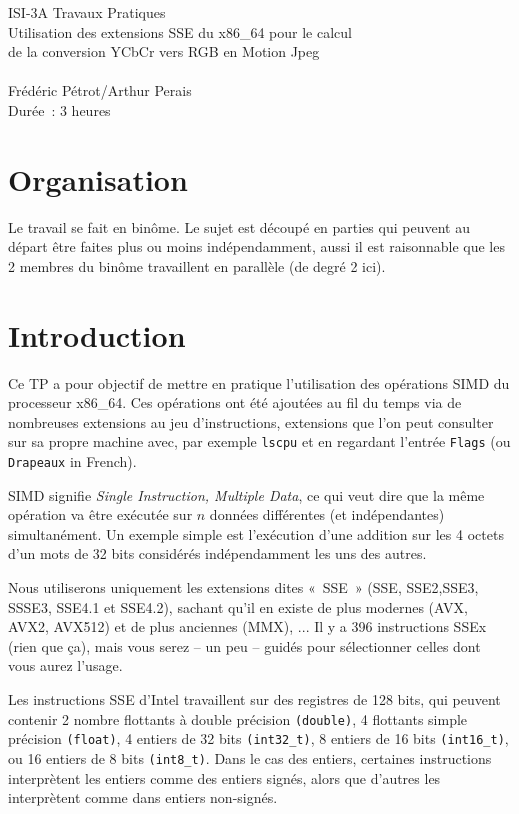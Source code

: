 \documentclass[a4paper,12pt]{article}
\begin{document}
\begin{center}
\Large
ISI-3A Travaux Pratiques\\
Utilisation des extensions SSE du x86\_64 pour le calcul\\
de la conversion YCbCr vers RGB en Motion Jpeg\\~\\
\large
Frédéric Pétrot/Arthur Perais\\
Durée~: 3 heures
\end{center}

\section{Organisation}
Le travail se fait en binôme.
Le sujet est découpé en parties qui peuvent au départ être faites plus ou moins indépendamment, aussi il est raisonnable que les 2 membres du binôme travaillent en parallèle (de degré 2 ici).

\section{Introduction}
Ce TP a pour objectif de mettre en pratique l'utilisation des opérations SIMD du processeur x86\_64.
Ces opérations ont été ajoutées au fil du temps via de nombreuses extensions au jeu d'instructions, extensions que l'on peut consulter sur sa propre machine avec, par exemple \texttt{lscpu} et en regardant l'entrée \texttt{Flags} (ou \texttt{Drapeaux} in French).

SIMD signifie \emph{Single Instruction, Multiple Data}, ce qui veut dire que la même opération va être exécutée sur $n$ données différentes (et indépendantes) simultanément.
Un exemple simple est l'exécution d'une addition sur les 4 octets d'un mots de 32 bits considérés indépendamment les uns des autres.

Nous utiliserons uniquement les extensions dites «~SSE~» (SSE, SSE2,SSE3, SSSE3, SSE4.1 et SSE4.2), sachant qu'il en existe de plus modernes (AVX, AVX2, AVX512) et de plus anciennes (MMX), ...
Il y a 396 instructions SSEx (rien que ça), mais vous serez -- un peu -- guidés pour sélectionner celles dont vous aurez l'usage.


Les instructions SSE d'Intel travaillent sur des registres de 128 bits, qui peuvent contenir 2 nombre flottants à double précision \lstinline{(double)}, 4 flottants simple précision \lstinline{(float)}, 4 entiers de 32 bits \lstinline{(int32_t)}, 8 entiers de 16 bits \lstinline{(int16_t)}, ou 16 entiers de 8 bits \lstinline{(int8_t)}. Dans le cas des entiers, certaines instructions interprètent les entiers comme des entiers signés, alors que d'autres les interprètent comme dans entiers non-signés. 
	
\end{document}

